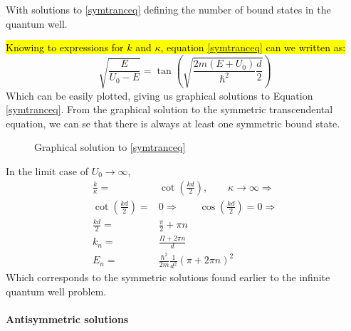 				With solutions to \ref{symtranceq} defining the number of bound states in the quantum well. 
				
				\hl{Knowing to expressions for $k$ and $\kappa$, equation \ref{symtranceq} can we written as:}
				\begin{equation}
					\sqrt{\frac{E}{U_0-E}} = \tan\left(\sqrt{\frac{2m(E+U_0)}{\hbar^2}\frac{d}{2}}\right)
				\end{equation}
				Which can be easily plotted, giving us graphical solutions to Equation \ref{symtranceq}. From the graphical solution to the symmetric transcendental equation, we can se that there is always at least one symmetric bound state.
				\begin{figure}[!h]
					\centering
					
					\caption{Graphical solution to \ref{symtranceq}}
				\end{figure}
				
				In the limit case of $U_0 \rightarrow \infty$,
				\begin{align}
					\frac{k}{\kappa} =& \cot(\frac{kd}{2}),\qquad \kappa \rightarrow \infty \Rightarrow \\
					\cot(\frac{kd}{2}) =& 0 \Rightarrow\qquad	\cos(\frac{kd}{2}) = 0 \Rightarrow\\
					\frac{kd}{2} =& \frac{\pi}{2} + \pi n \\
					k_n =& \frac{\Pi + 2\pi n}{d} \\
					E_n =& \frac{\hbar^2}{2m}\frac{1}{d^2}\left(\pi + 2\pi n\right)^2
				\end{align}
				Which corresponds to the symmetric solutions found earlier to the infinite quantum well problem.
				
			\paragraph{Antisymmetric solutions}
				
